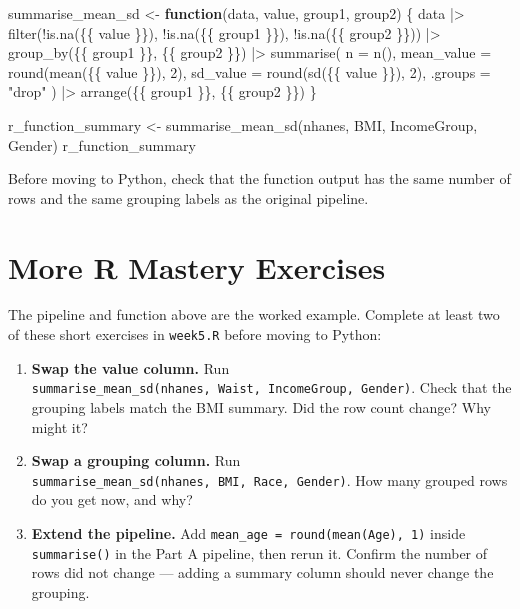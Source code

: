 \documentclass[
  letterpaper,
  DIV=11,
  numbers=noendperiod,
  oneside]{scrreprt}
\newenvironment{Shaded}{\begin{snugshade}}{\end{snugshade}}
\newcommand{\AttributeTok}[1]{\textcolor[rgb]{0.40,0.45,0.13}{#1}}
\newcommand{\ControlFlowTok}[1]{\textcolor[rgb]{0.00,0.23,0.31}{\textbf{#1}}}
\newcommand{\DecValTok}[1]{\textcolor[rgb]{0.68,0.00,0.00}{#1}}
\newcommand{\FunctionTok}[1]{\textcolor[rgb]{0.28,0.35,0.67}{#1}}
\newcommand{\NormalTok}[1]{\textcolor[rgb]{0.00,0.23,0.31}{#1}}
\newcommand{\OtherTok}[1]{\textcolor[rgb]{0.00,0.23,0.31}{#1}}
\newcommand{\SpecialCharTok}[1]{\textcolor[rgb]{0.37,0.37,0.37}{#1}}
\newcommand{\StringTok}[1]{\textcolor[rgb]{0.13,0.47,0.30}{#1}}
\providecommand{\tightlist}{%
  \setlength{\itemsep}{0pt}\setlength{\parskip}{0pt}}
\begin{document}
\begin{Shaded}
\begin{Highlighting}[numbers=left,,]
\NormalTok{summarise\_mean\_sd }\OtherTok{\textless{}{-}} \ControlFlowTok{function}\NormalTok{(data, value, group1, group2) \{}
\NormalTok{  data }\SpecialCharTok{|\textgreater{}}
    \FunctionTok{filter}\NormalTok{(}\SpecialCharTok{!}\FunctionTok{is.na}\NormalTok{(\{\{ value \}\}), }\SpecialCharTok{!}\FunctionTok{is.na}\NormalTok{(\{\{ group1 \}\}), }\SpecialCharTok{!}\FunctionTok{is.na}\NormalTok{(\{\{ group2 \}\})) }\SpecialCharTok{|\textgreater{}}
    \FunctionTok{group\_by}\NormalTok{(\{\{ group1 \}\}, \{\{ group2 \}\}) }\SpecialCharTok{|\textgreater{}}
    \FunctionTok{summarise}\NormalTok{(}
      \AttributeTok{n =} \FunctionTok{n}\NormalTok{(),}
      \AttributeTok{mean\_value =} \FunctionTok{round}\NormalTok{(}\FunctionTok{mean}\NormalTok{(\{\{ value \}\}), }\DecValTok{2}\NormalTok{),}
      \AttributeTok{sd\_value =} \FunctionTok{round}\NormalTok{(}\FunctionTok{sd}\NormalTok{(\{\{ value \}\}), }\DecValTok{2}\NormalTok{),}
      \AttributeTok{.groups =} \StringTok{"drop"}
\NormalTok{    ) }\SpecialCharTok{|\textgreater{}}
    \FunctionTok{arrange}\NormalTok{(\{\{ group1 \}\}, \{\{ group2 \}\})}
\NormalTok{\}}

\NormalTok{r\_function\_summary }\OtherTok{\textless{}{-}} \FunctionTok{summarise\_mean\_sd}\NormalTok{(nhanes, BMI, IncomeGroup, Gender)}
\NormalTok{r\_function\_summary}
\end{Highlighting}
\end{Shaded}

Before moving to Python, check that the function output has the same
number of rows and the same grouping labels as the original pipeline.

\section{More R Mastery Exercises}\label{more-r-mastery-exercises}

The pipeline and function above are the worked example. Complete at
least two of these short exercises in \texttt{week5.R} before moving to
Python:

\begin{enumerate}
\def\labelenumi{\arabic{enumi}.}
\tightlist
\item
  \textbf{Swap the value column.} Run
  \texttt{summarise\_mean\_sd(nhanes,\ Waist,\ IncomeGroup,\ Gender)}.
  Check that the grouping labels match the BMI summary. Did the row
  count change? Why might it?
\item
  \textbf{Swap a grouping column.} Run
  \texttt{summarise\_mean\_sd(nhanes,\ BMI,\ Race,\ Gender)}. How many
  grouped rows do you get now, and why?
\item
  \textbf{Extend the pipeline.} Add
  \texttt{mean\_age\ =\ round(mean(Age),\ 1)} inside
  \texttt{summarise()} in the Part A pipeline, then rerun it. Confirm
  the number of rows did not change --- adding a summary column should
  never change the grouping.
\end{enumerate}
\end{document}
